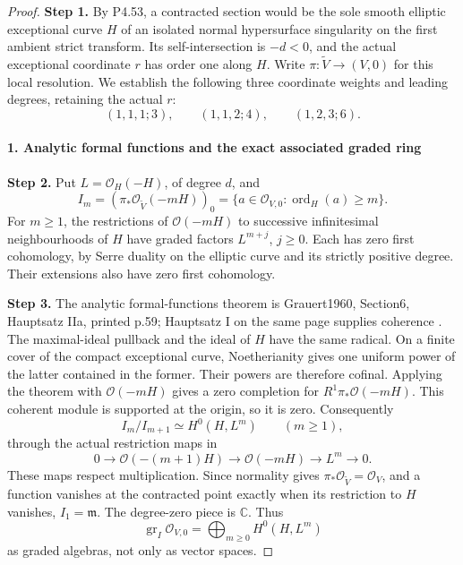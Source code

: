 \begin{proof}
\noindent\textbf{Step 1.} By P4.53, a contracted section would be the sole smooth
elliptic exceptional curve $H$ of an isolated normal
hypersurface singularity on the first ambient strict
transform. Its self-intersection is $-d<0$, and the
actual exceptional coordinate $r$ has order one along
$H$. Write $\pi:\widetilde V\to(V,0)$ for this local
resolution. We establish the following three coordinate
weights and leading degrees, retaining the actual $r$:
\[
 (1,1,1;3),\qquad(1,1,2;4),\qquad(1,2,3;6).
                                                        \tag{4.54w.1}
\]

\paragraph{1. Analytic formal functions and the exact associated graded ring}

\noindent\textbf{Step 2.} Put \(L=\mathcal O_H(-H)\), of degree \(d\), and
\[
 I_m=(\pi_*\mathcal O_{\widetilde V}(-mH))_0
     =\{a\in\mathcal O_{V,0}:\operatorname{ord}_H(a)\ge m\}.
\]
For \(m\ge1\), the restrictions of
\(\mathcal O(-mH)\) to successive infinitesimal neighbourhoods
of \(H\) have graded factors \(L^{m+j}\), \(j\ge0\).
Each has zero first cohomology, by Serre duality on the elliptic
curve and its strictly positive degree. Their extensions also
have zero first cohomology.

\noindent\textbf{Step 3.} The analytic formal-functions theorem is Grauert1960,
Section6, Hauptsatz IIa, printed p.59; Hauptsatz I on the same
page supplies coherence \cite[\S6, Hauptsätze I and IIa]{Grauert60}. The maximal-ideal pullback and the
ideal of \(H\) have the same radical. On a finite cover of
the compact exceptional curve, Noetherianity gives one uniform
power of the latter contained in the former. Their powers are
therefore cofinal. Applying the theorem with
\(\mathcal O(-mH)\) gives a zero completion for
\(R^1\pi_*\mathcal O(-mH)\). This coherent module is
supported at the origin, so it is zero. Consequently
\[
 I_m/I_{m+1}\simeq H^0(H,L^m)\qquad(m\ge1),             \tag{4.54w.2}
\]
through the actual restriction maps in
\[
 0\longrightarrow\mathcal O(-(m+1)H)
 \longrightarrow\mathcal O(-mH)
 \longrightarrow L^m\longrightarrow0.
\]
These maps respect multiplication. Since normality gives
\(\pi_*\mathcal O_{\widetilde V}=\mathcal O_V\), and a
function vanishes at the contracted point exactly when its
restriction to \(H\) vanishes, \(I_1=\mathfrak m\).
The degree-zero piece is \(\mathbb C\). Thus
\[
 \operatorname{gr}_{I}\mathcal O_{V,0}
   =\bigoplus_{m\ge0}H^0(H,L^m)                         \tag{4.54w.3}
\]
as graded algebras, not only as vector spaces.


\end{proof}
